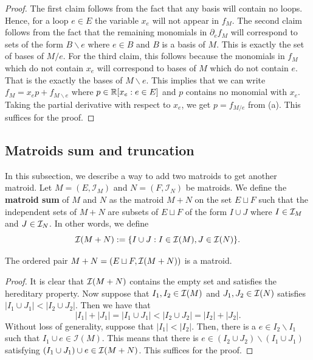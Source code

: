 \documentclass{puthesis-UG}
\begin{document}
\begin{proof}
	The first claim follows from the fact that any basis will contain no loops. Hence, for a loop $e \in E$ the variable $x_e$ will not appear in $f_M$. The second claim follows from the fact that the remaining monomials in $\partial_e f_M$ will correspond to sets of the form $B \backslash e$ where $e \in B$ and $B$ is a basis of $M$. This is exactly the set of bases of $M / e$. For the third claim, this follows	because the monomials in $f_M$ which do not contain $x_e$ will correspond to bases of $M$ which do not contain $e$. That is the exactly the bases of $M \backslash e$. This implies that we can write $f_M = x_e p + f_{M \backslash e}$ where $p \in \mathbb{R}[x_e : e \in E]$ and $p$ contains no monomial with $x_e$. Taking the partial derivative with respect to $x_e$, we get $p = f_{M / e}$ from (a). This suffices for the proof. 
\end{proof}

\subsection{Matroids sum and truncation}

In this subsection, we describe a way to add two matroids to get another matroid. Let $M = (E, \mathcal{I}_M)$ and $N = (F, \mathcal{I}_N)$ be matroids. We define the \textbf{matroid sum} of $M$ and $N$ as the matroid $M+N$ on the set $E \sqcup F$ such that the independent sets of $M+N$ are subsets of $E \sqcup F$ of the form $I \cup J$ where $I \in \mathcal{I}_M$ and $J \in \mathcal{I}_N$. In other words, we define
\[
	\mathcal{I}(M+N) := \{I \cup J : I \in \mathcal{I}(M), J \in \mathcal{I}(N)\}.
\]

\begin{prop} \label{proposition-matroid-sum-is-well-defined}
	The ordered pair $M+N = (E \sqcup F, \mathcal{I}(M+N))$ is a matroid. 
\end{prop}

\begin{proof}
	It is clear that $\mathcal{I}(M+N)$ contains the empty set and satisfies the hereditary property. Now suppose that $I_1, I_2 \in \mathcal{I}(M)$ and $J_1, J_2 \in \mathcal{I}(N)$ satisfies $|I_1 \cup J_1| < |I_2 \cup J_2|$. Then we have that
	\[
		|I_1| + |J_1| = |I_1 \cup J_1| < |I_2 \cup J_2| = |I_2| + |J_2|.
	\]
	Without loss of generality, suppose that $|I_1| < |I_2|$. Then, there is a $e \in I_2 \backslash I_1$ such that $I_1 \cup e \in \mathcal{I}(M)$. This means that there is $e \in (I_2 \cup J_2) \backslash (I_1 \cup J_1)$ satisfying $(I_1 \cup J_1) \cup e \in \mathcal{I}(M+N)$. This suffices for the proof. 
\end{proof}
\end{document}
